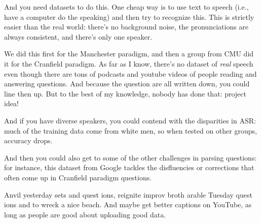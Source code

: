 And you need datasets to do this.  One cheap way is to use text to speech (i.e., have a computer do the speaking) and then try to recognize this.  This is strictly easier than the real world: there’s no background noise, the pronunciations are always consistent, and there’s only one speaker.

We did this first for the Manchester paradigm, and then a group from CMU did it for the Cranfield paradigm.  As far as I know, there’s no dataset of \emph{real} speech even though there are tons of podcasts and youtube videos of people reading and answering questions.  And because the question are all written down, you could line then up.  But to the best of my knowledge, nobody has done that: project idea!

And if you have diverse speakers, you could contend with the disparities in ASR: much of the training data come from white men, so when tested on other groups, accuracy drops.

And then you could also get to some of the other challenges in parsing questions: for instance, this dataset from Google tackles the disfluencies or corrections that often come up in Cranfield paradigm questions.

Anvil yesterday sets and quest ions, reignite improv broth arable Tuesday quest ions and to wreck a nice beach.  And maybe get better captions on YouTube, as long as people are good about uploading good data.


